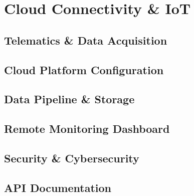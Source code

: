 \section{Cloud Connectivity \& IoT}

\subsection{Telematics \& Data Acquisition}

\subsection{Cloud Platform Configuration}

\subsection{Data Pipeline \& Storage}

\subsection{Remote Monitoring Dashboard}

\subsection{Security \& Cybersecurity}

\subsection{API Documentation}
